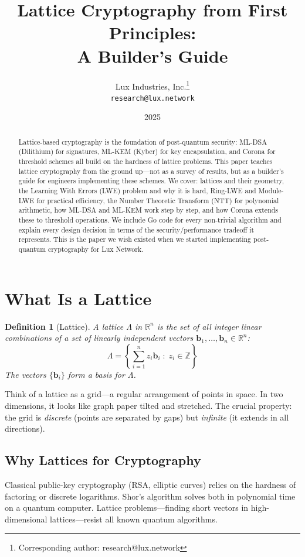 \documentclass[11pt,a4paper]{article}
\title{Lattice Cryptography from First Principles:\\A Builder's Guide}
\author{
Lux Industries, Inc.\thanks{Corresponding author: research@lux.network}\\
\texttt{research@lux.network}
}
\date{2025}
\newtheorem{definition}{Definition}
\begin{document}
\luxcoverpage

\begin{abstract}
Lattice-based cryptography is the foundation of post-quantum security: ML-DSA (Dilithium)
for signatures, ML-KEM (Kyber) for key encapsulation, and Corona for threshold schemes
all build on the hardness of lattice problems. This paper teaches lattice cryptography
from the ground up---not as a survey of results, but as a builder's guide for engineers
implementing these schemes. We cover: lattices and their geometry, the Learning With Errors
(LWE) problem and why it is hard, Ring-LWE and Module-LWE for practical efficiency, the
Number Theoretic Transform (NTT) for polynomial arithmetic, how ML-DSA and ML-KEM work
step by step, and how Corona extends these to threshold operations. We include Go code
for every non-trivial algorithm and explain every design decision in terms of the
security/performance tradeoff it represents. This is the paper we wish existed when we
started implementing post-quantum cryptography for Lux Network.
\end{abstract}

\tableofcontents
\newpage

\section{What Is a Lattice}

\begin{definition}[Lattice]
A lattice $\Lambda$ in $\mathbb{R}^n$ is the set of all integer linear combinations of
a set of linearly independent vectors $\mathbf{b}_1, \ldots, \mathbf{b}_n \in \mathbb{R}^n$:
\[
\Lambda = \left\{ \sum_{i=1}^n z_i \mathbf{b}_i \;:\; z_i \in \mathbb{Z} \right\}
\]
The vectors $\{\mathbf{b}_i\}$ form a \emph{basis} for $\Lambda$.
\end{definition}

Think of a lattice as a grid---a regular arrangement of points in space. In two dimensions,
it looks like graph paper tilted and stretched. The crucial property: the grid is
\emph{discrete} (points are separated by gaps) but \emph{infinite} (it extends in all
directions).

\subsection{Why Lattices for Cryptography}

Classical public-key cryptography (RSA, elliptic curves) relies on the hardness of
factoring or discrete logarithms. Shor's algorithm solves both in polynomial time on a
quantum computer. Lattice problems---finding short vectors in high-dimensional
lattices---resist all known quantum algorithms.
\end{document}
